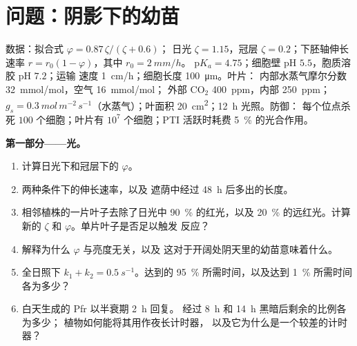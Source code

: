 \section{问题：阴影下的幼苗}

\begin{problem}
\label{pb:b3:plant-molecular-physiology:1}
数据：拟合式 $\varphi = 0.87\,\zeta/(\zeta + 0.6)$；
日光 $\zeta = 1.15$，冠层 $\zeta = 0.2$；下胚轴伸长
速率 $r = r_{0}(1 - \varphi)$，其中 $r_{0} = \qty{2}{mm/h}$。
$\mathrm{p}K_{a} = 4.75$；细胞壁 pH $5.5$，胞质溶胶 pH $7.2$；运输
速度 \qty{1}{cm/h}；细胞长度 \qty{100}{\micro m}。叶片：
内部水蒸气摩尔分数 \qty{32}{mmol/mol}，空气 \qty{16}{mmol/mol}；
外部 CO$_{2}$ \qty{400}{ppm}，内部 \qty{250}{ppm}；$g_{s} =
\qty{0.3}{mol\,m^{-2}\,s^{-1}}$（水蒸气）；叶面积
\qty{20}{cm^2}；\qty{12}{h} 光照。防御：
每个位点杀死 $100$ 个细胞；叶片有 $10^{7}$ 个细胞；PTI
活跃时耗费 \qty{5}{\%} 的光合作用。

\medskip
\noindent\textbf{第一部分——光。}
\begin{enumerate}
  \item 计算日光下和冠层下的 $\varphi$。
  \item 两种条件下的伸长速率，以及
        遮荫中经过 \qty{48}{h} 后多出的长度。
  \item 相邻植株的一片叶子去除了日光中 \qty{90}{\%} 的红光，以及
        \qty{20}{\%} 的远红光。计算新的 $\zeta$
        和 $\varphi$。单片叶子是否足以触发
        反应？
  \item 解释为什么 $\varphi$ 与亮度无关，以及
        这对于开阔处阴天里的幼苗意味着什么。
  \item 全日照下 $k_{1} + k_{2} = \qty{0.5}{s^{-1}}$。达到的
        \qty{95}{\%} 所需时间，以及达到
        \qty{1}{\%} 所需时间各为多少？
  \item 白天生成的 Pfr 以半衰期 \qty{2}{h} 回复。
        经过 \qty{8}{h} 和 \qty{14}{h} 黑暗后剩余的比例各为多少；
        植物如何能将其用作夜长计时器，
        以及它为什么是一个较差的计时器？
\end{enumerate}


\end{problem}
